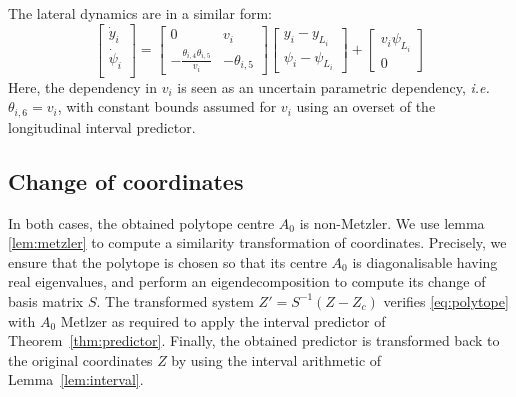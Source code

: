 \documentclass{article}
\begin{document}
The lateral dynamics are in a similar form:
\begin{equation*}
\begin{bmatrix}
\dot{y}_i \\
\dot{\psi}_i \\
\end{bmatrix}
=
\begin{bmatrix}
0 & v_i \\
-\frac{\theta_{i,4} \theta_{i,5}}{v_i} & -\theta_{i,5}
\end{bmatrix}
\begin{bmatrix}
y_i - y_{L_i} \\
\psi_i - \psi_{L_i}
\end{bmatrix}
+
\begin{bmatrix}
v_i\psi_{L_i} \\
0
\end{bmatrix}
\end{equation*}
Here, the dependency in $v_i$ is seen as an uncertain parametric dependency, \emph{i.e.} $\theta_{i,6}=v_i$, with constant bounds assumed for $v_i$ using an overset of the longitudinal interval predictor.

\subsection{Change of coordinates}
In both cases, the obtained polytope centre $A_0$ is non-Metzler.
We use lemma \ref{lem:metzler} to compute a similarity transformation of coordinates. Precisely, we ensure that the polytope is chosen so that its centre $A_0$ is diagonalisable having real eigenvalues, and perform an eigendecomposition to compute its change of basis matrix $S$. The transformed system $Z'=S^{-1}(Z-Z_c)$ verifies \eqref{eq:polytope} with $A_0$ Metlzer as required to apply the interval predictor of Theorem~\ref{thm:predictor}. Finally, the obtained predictor is transformed back to the original coordinates $Z$ by using the interval arithmetic of Lemma~\ref{lem:interval}.



\end{document}

